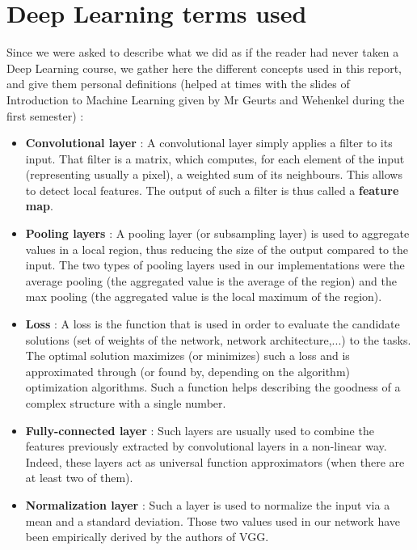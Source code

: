 \documentclass[twocolumn,superscriptaddress,aps,floatfix, nofootinbib]{revtex4-1}
\begin{document}
    \section{Deep Learning terms used}
    
    Since we were asked to describe what we did as if the reader had never taken a Deep Learning course, we gather here the different concepts used in this report, and give them personal definitions (helped at times with the slides of Introduction to Machine Learning given by Mr Geurts and Wehenkel during the first semester) :
    
    \begin{itemize}
        \item \textbf{Convolutional layer} : A convolutional layer simply applies a filter to its input. That filter is a matrix, which computes, for each element of the input (representing usually a pixel), a weighted sum of its neighbours. This allows to detect local features. The output of such a filter is thus called a \textbf{feature map}.
        
        \item \textbf{Pooling layers} : A pooling layer (or subsampling layer) is used to aggregate values in a local region, thus reducing the size of the output compared to the input. The two types of pooling layers used in our implementations were the average pooling (the aggregated value is the average of the region) and the max pooling (the aggregated value is the local maximum of the region).
        
        \item \textbf{Loss} : A loss is the function that is used in order to evaluate the candidate solutions (set of weights of the network, network architecture,...) to the tasks. The optimal solution maximizes (or minimizes) such a loss and is approximated through (or found by, depending on the algorithm) optimization algorithms. Such a function helps describing the goodness of a complex structure with a single number\cite{loss}.
        
        \item \textbf{Fully-connected layer} : Such layers are usually used to combine the features previously extracted by convolutional layers in a non-linear way. Indeed, these layers act as universal function approximators (when there are at least two of them).
        
        \item \textbf{Normalization layer} : Such a layer is used to normalize the input via a mean and a standard deviation. Those two values used in our network have been empirically derived by the authors of VGG.
        

\end{itemize}
\end{document}
